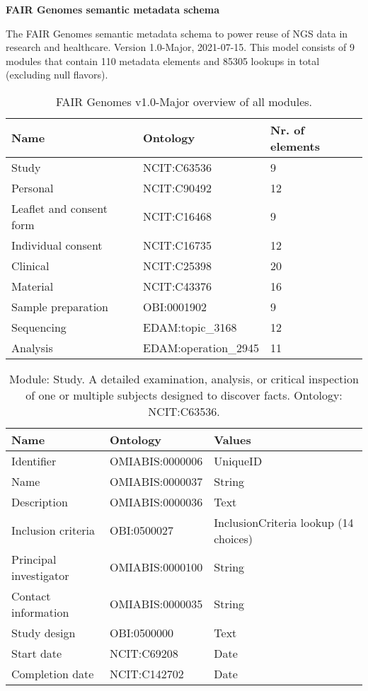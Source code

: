 \documentclass{article}
\begin{document}
\setlength\parindent{0pt}

\textbf{FAIR Genomes semantic metadata schema}
\newline

The FAIR Genomes semantic metadata schema to power reuse of NGS data in research and healthcare. Version 1.0-Major, 2021-07-15. This model consists of 9 modules that contain 110 metadata elements and 85305 lookups in total (excluding null flavors).

\begin{table}[htb]
\begin{tabular}{lll}
Name & Ontology & Nr. of elements \\
\hline
Study & NCIT:C63536 & 9 \\
Personal & NCIT:C90492 & 12 \\
Leaflet and consent form & NCIT:C16468 & 9 \\
Individual consent & NCIT:C16735 & 12 \\
Clinical & NCIT:C25398 & 20 \\
Material & NCIT:C43376 & 16 \\
Sample preparation & OBI:0001902 & 9 \\
Sequencing & EDAM:topic\_3168 & 12 \\
Analysis & EDAM:operation\_2945 & 11 \\
\hline
\end{tabular}
\caption[Module overview]{\label{table:table1} FAIR Genomes v1.0-Major overview of all modules.}
\end{table}

\begin{table}[htb]
\begin{tabular}{lll}
Name & Ontology & Values \\
\hline
Identifier & OMIABIS:0000006 & UniqueID \\
Name & OMIABIS:0000037 & String \\
Description & OMIABIS:0000036 & Text \\
Inclusion criteria & OBI:0500027 & InclusionCriteria lookup (14 choices) \\
Principal investigator & OMIABIS:0000100 & String \\
Contact information & OMIABIS:0000035 & String \\
Study design & OBI:0500000 & Text \\
Start date & NCIT:C69208 & Date \\
Completion date & NCIT:C142702 & Date \\
\hline
\end{tabular}
\caption[Module: Study]{\label{table:table2} Module: Study. A detailed examination, analysis, or critical inspection of one or multiple subjects designed to discover facts. Ontology: NCIT:C63536. }
\end{table}
\end{document}

